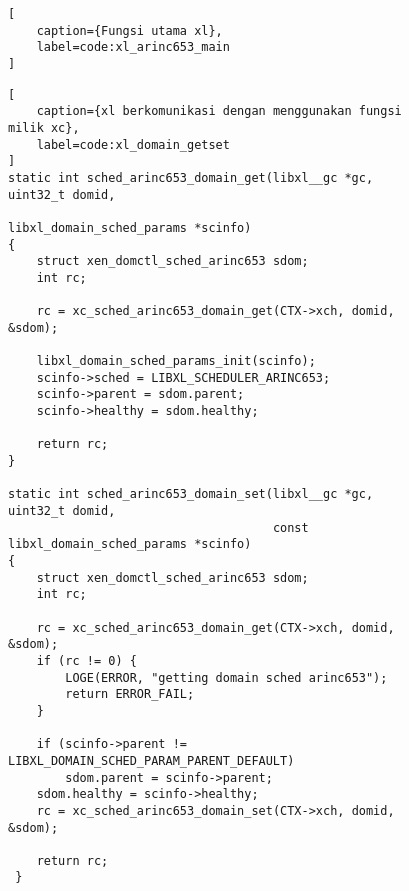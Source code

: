 \begin{figure}
\begin{lstlisting}[
	caption={Fungsi utama xl},
	label=code:xl_arinc653_main
]

\end{lstlisting}
\end{figure}

\begin{figure}
\begin{lstlisting}[
	caption={xl berkomunikasi dengan menggunakan fungsi milik xc},
	label=code:xl_domain_getset
]
static int sched_arinc653_domain_get(libxl__gc *gc, uint32_t domid,
                                   libxl_domain_sched_params *scinfo)
{
    struct xen_domctl_sched_arinc653 sdom;
    int rc;

    rc = xc_sched_arinc653_domain_get(CTX->xch, domid, &sdom);

    libxl_domain_sched_params_init(scinfo);
    scinfo->sched = LIBXL_SCHEDULER_ARINC653;
    scinfo->parent = sdom.parent;
    scinfo->healthy = sdom.healthy;

    return rc;
}

static int sched_arinc653_domain_set(libxl__gc *gc, uint32_t domid,
                                     const libxl_domain_sched_params *scinfo)
{
    struct xen_domctl_sched_arinc653 sdom;
    int rc;

    rc = xc_sched_arinc653_domain_get(CTX->xch, domid, &sdom);
    if (rc != 0) {
        LOGE(ERROR, "getting domain sched arinc653");
        return ERROR_FAIL;
    }

    if (scinfo->parent != LIBXL_DOMAIN_SCHED_PARAM_PARENT_DEFAULT)
        sdom.parent = scinfo->parent;
    sdom.healthy = scinfo->healthy;
    rc = xc_sched_arinc653_domain_set(CTX->xch, domid, &sdom);

    return rc;
 }
\end{lstlisting}
\end{figure}



